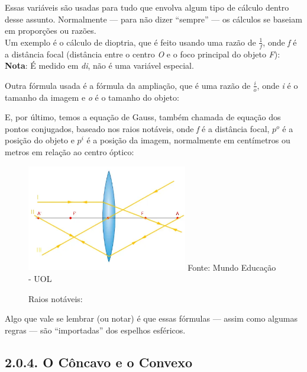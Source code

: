 \documentclass[
  a4paper]{article}
\begin{document}
Essas variáveis são usadas para tudo que envolva algum tipo de cálculo
dentro desse assunto. Normalmente --- para não dizer ``sempre'' --- os
cálculos se baseiam em proporções ou razões.\\
Um exemplo é o cálculo de dioptria, que é feito usando uma razão de
\(\frac{1}{f}\), onde \emph{f} é a distância focal (distância entre o
centro \emph{O} e o foco principal do objeto \emph{F}):\\
\textbf{Nota}: É medido em \emph{di}, não é uma variável especial.\\

Outra fórmula usada é a fórmula da ampliação, que é uma razão de
\(\frac{i}{o}\), onde \emph{i} é o tamanho da imagem e \emph{o} é o
tamanho do objeto:\\

E, por último, temos a equação de Gauss, também chamada de equação dos
pontos conjugados, baseado nos raios notáveis, onde \emph{f} é a
distância focal, \(p^{o}\) é a posição do objeto e \(p^{i}\) é a posição
da imagem, normalmente em centímetros ou metros em relação ao centro
óptico:


\begin{figure}[!h]
\centering
    \caption{Raios notáveis:} 
    \includegraphics[width=70mm]{../_img/raios-notaveis.png}
    \linebreak
        Fonte: Mundo Educação - UOL 
\end{figure}

Algo que vale se lembrar (ou notar) é que essas fórmulas --- assim como
algumas regras --- são ``importadas'' dos espelhos esféricos.

\newpage

\hypertarget{o-cuxf4ncavo-e-o-convexo}{%
\subsection{2.0.4. O Côncavo e o
Convexo}\label{o-cuxf4ncavo-e-o-convexo}}
\end{document}
